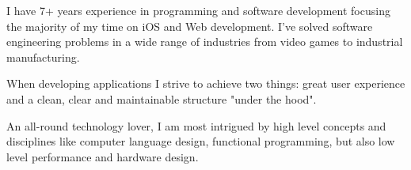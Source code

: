 

\begin{cvparagraph}
I have 7+ years experience in programming and software development focusing the majority of my time on iOS and Web development. I've solved software engineering problems in a wide range of industries from video games to industrial manufacturing.

When developing applications I strive to achieve two things: great user experience and a clean, clear and maintainable structure "under the hood".

An all-round technology lover, I am most intrigued by high level concepts and disciplines like computer language design, functional programming, but also low level performance and hardware design.
\end{cvparagraph}
